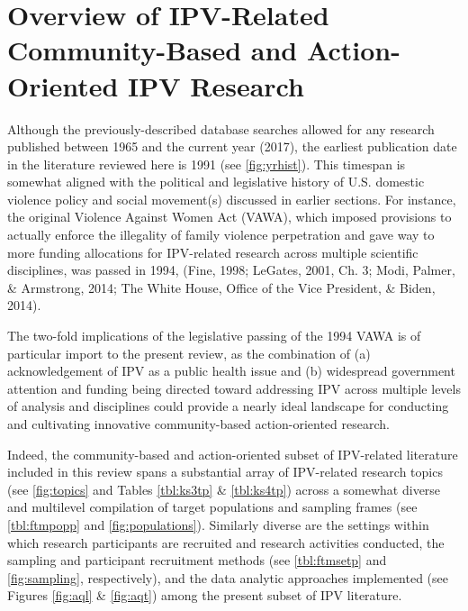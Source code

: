 \documentclass[11pt,]{tufte-book}
\begin{document}
\section{Overview of IPV-Related Community-Based and Action-Oriented IPV
Research}\label{overview-of-ipv-related-community-based-and-action-oriented-ipv-research}

Although the previously-described database searches allowed for any
research published between 1965 and the current year (2017), the
earliest publication date in the literature reviewed here is 1991 (see
\cref{fig:yrhist}). This timespan is somewhat aligned
with the political and legislative history of U.S. domestic violence
policy and social movement(s) discussed in earlier sections. For
instance, the original Violence Against Women Act (VAWA), which imposed
provisions to actually enforce the illegality of family violence
perpetration and gave way to more funding allocations for IPV-related
research across multiple scientific disciplines, was passed in 1994,
(Fine, 1998; LeGates, 2001, Ch. 3; Modi, Palmer, \& Armstrong, 2014; The
White House, Office of the Vice President, \& Biden, 2014).

The two-fold implications of the legislative passing of the 1994 VAWA is
of particular import to the present review, as the combination of (a)
acknowledgement of IPV as a public health issue and (b) widespread
government attention and funding being directed toward addressing IPV
across multiple levels of analysis and disciplines could provide a
nearly ideal landscape for conducting and cultivating innovative
community-based action-oriented research.

Indeed, the community-based and action-oriented subset of IPV-related
literature included in this review spans a substantial array of
IPV-related research topics (see \cref{fig:topics} and
Tables \ref{tbl:ks3tp} \& \ref{tbl:ks4tp}) across a somewhat diverse and
multilevel compilation of target populations and sampling frames (see
\cref{tbl:ftmpopp} and
\cref{fig:populations}). Similarly diverse are the
settings within which research participants are recruited and research
activities conducted, the sampling and participant recruitment methods
(see \cref{tbl:ftmsetp} and
\cref{fig:sampling}, respectively), and the data
analytic approaches implemented (see Figures \ref{fig:aql} \&
\ref{fig:aqt}) among the present subset of IPV literature.
\end{document}

